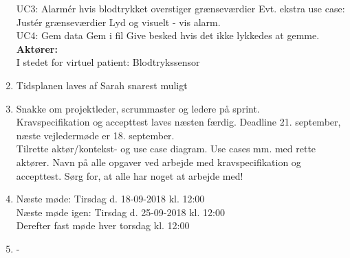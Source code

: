 \begin{enumerate}
	UC3: Alarmér hvis blodtrykket overstiger grænseværdier
	Evt. ekstra use case: Justér grænseværdier
	Lyd og visuelt - vis alarm.\\
	
	UC4: Gem data
	Gem i fil
	Give besked hvis det ikke lykkedes at gemme.\\
	
	\textbf{Aktører:} \\ I stedet for virtuel patient: Blodtrykssensor \\
	
	\item Tidsplanen laves af Sarah snarest muligt \\
	\item Snakke om projektleder, scrummaster og ledere på sprint. \\
	Kravspecifikation og accepttest laves næsten færdig. Deadline 21. september, næste vejledermøde er 18. september. \\ Tilrette aktør/kontekst- og use case diagram. Use cases mm. med rette aktører.
	Navn på alle opgaver ved arbejde med kravspecifikation og accepttest. Sørg for, at alle har noget at arbejde med! \\
	
	\item Næste møde: Tirsdag d. 18-09-2018 kl. 12:00 \\ Næste møde igen: Tirsdag d. 25-09-2018 kl. 12:00 \\ Derefter fast møde hver torsdag kl. 12:00\\
	
	\item -
	
\end{enumerate}

\clearpage